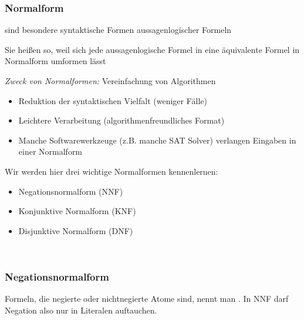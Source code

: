 \documentclass[aspectratio=1610,onlymath]{beamer}
\begin{document}
\begin{frame}\frametitle{Normalform}

 sind besondere syntaktische Formen aussagenlogischer Formeln
\bigskip

Sie heißen so, weil sich jede aussagenlogische Formel in eine äquivalente Formel in Normalform umformen lässt
\bigskip

\emph{Zweck von Normalformen:} Vereinfachung von Algorithmen
\begin{itemize}
\item Reduktion der syntaktischen Vielfalt (weniger Fälle)
\item Leichtere Verarbeitung (algorithmenfreundliches Format)
\item Manche Softwarewerkzeuge (z.B. manche SAT Solver) verlangen Eingaben in einer Normalform
\end{itemize}
\bigskip

Wir werden hier drei wichtige Normalformen kennenlernen:
\begin{itemize}
\item \alert{Negationsnormalform} (NNF)
\item \alert{Konjunktive Normalform} (KNF)
\item \alert{Disjunktive Normalform} (DNF)
\end{itemize}
\
\end{frame}

\begin{frame}\frametitle{Negationsnormalform}

\medskip

Formeln, die negierte oder nichtnegierte Atome sind, nennt man .
In NNF darf Negation also nur in Literalen auftauchen.
\medskip\pause


\end{frame}
\end{document}
